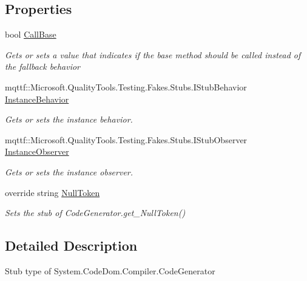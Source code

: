\subsection*{Properties}
\begin{DoxyCompactItemize}
\item 
bool \hyperlink{class_system_1_1_code_dom_1_1_compiler_1_1_fakes_1_1_stub_code_generator_a15b3a3fe994256b553266bb29012df44}{Call\-Base}
\begin{DoxyCompactList}\small\item\em Gets or sets a value that indicates if the base method should be called instead of the fallback behavior\end{DoxyCompactList}\item 
mqttf\-::\-Microsoft.\-Quality\-Tools.\-Testing.\-Fakes.\-Stubs.\-I\-Stub\-Behavior \hyperlink{class_system_1_1_code_dom_1_1_compiler_1_1_fakes_1_1_stub_code_generator_a0cff5cf003d0c7792640239de935926e}{Instance\-Behavior}
\begin{DoxyCompactList}\small\item\em Gets or sets the instance behavior.\end{DoxyCompactList}\item 
mqttf\-::\-Microsoft.\-Quality\-Tools.\-Testing.\-Fakes.\-Stubs.\-I\-Stub\-Observer \hyperlink{class_system_1_1_code_dom_1_1_compiler_1_1_fakes_1_1_stub_code_generator_a2b3ef680fe6ef51106d22bf774ead5e9}{Instance\-Observer}
\begin{DoxyCompactList}\small\item\em Gets or sets the instance observer.\end{DoxyCompactList}\item 
override string \hyperlink{class_system_1_1_code_dom_1_1_compiler_1_1_fakes_1_1_stub_code_generator_a90f58aa3bbfff07b8da51f899ef112e7}{Null\-Token}
\begin{DoxyCompactList}\small\item\em Sets the stub of Code\-Generator.\-get\-\_\-\-Null\-Token()\end{DoxyCompactList}\end{DoxyCompactItemize}


\subsection{Detailed Description}
Stub type of System.\-Code\-Dom.\-Compiler.\-Code\-Generator



